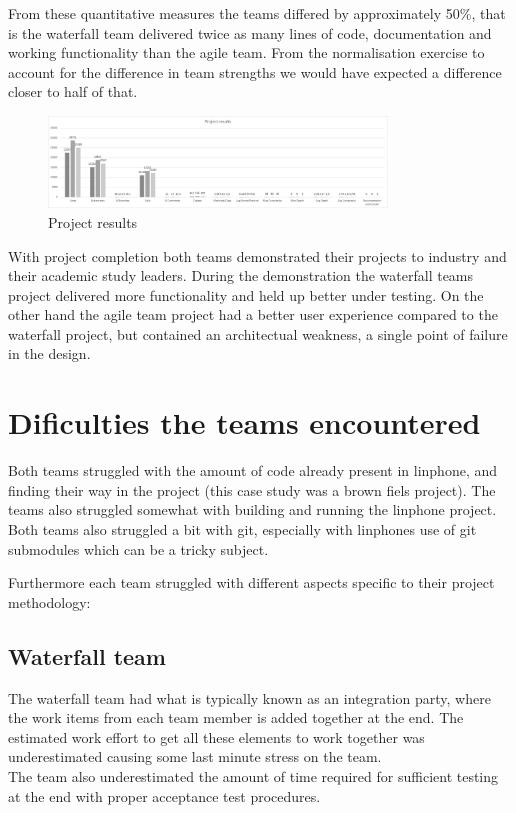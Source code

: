 \documentclass{sig-alternate-05-2015}
\begin{document}
From these quantitative measures the teams differed by approximately 50\%, that is the waterfall team delivered twice as many lines of code, documentation and working functionality than the agile team. From the normalisation exercise to account for the difference in team strengths we would have expected a difference closer to half of that. 

\begin{figure}[t!]
	\centering 
	\includegraphics[width=90mm]{Project results.png}
	\caption{Project results}
\end{figure}


With project completion both teams demonstrated their projects to industry and their academic study leaders. During the demonstration the waterfall teams project delivered more functionality and held up better under testing. On the other hand the agile team project had a better user experience compared to the waterfall project, but contained an architectual weakness, a single point of failure in the design.

\section{Dificulties the teams encountered} 

Both teams struggled with the amount of code already present in linphone, and finding their way in the project (this case study was a brown fiels project). The teams also struggled somewhat with building and running the linphone project. Both teams also struggled a bit with git, especially with linphones use of git submodules which can be a tricky subject.

Furthermore each team struggled with different aspects specific to their project methodology:

\subsection{Waterfall team}
The waterfall team had what is typically known as an integration party, where the work items from each team member is added together at the end. The estimated work effort to get all these elements to work together was underestimated causing some last minute stress on the team.
\\ 
The team also underestimated the amount of time required for sufficient testing at the end with proper acceptance test procedures.
\end{document}

